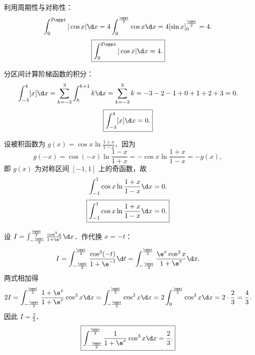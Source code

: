 \begin{solution}

    利用周期性与对称性：
    \begin{equation}
        \int_0^{2\uppi} |\cos x| \d x = 4 \int_0^{\frac{\uppi}{2}} \cos x \d x = 4 [\sin x]_0^{\frac{\uppi}{2}} = 4.
    \end{equation}
    \begin{equation}
        \boxed{\int_0^{2\uppi} |\cos x| \d x = 4.}
    \end{equation}


    分区间计算阶梯函数的积分：
    \begin{equation}
        \int_{-3}^4 [x] \d x = \sum_{k=-3}^3 \int_k^{k+1} k \d x = \sum_{k=-3}^3 k = -3 - 2 - 1 + 0 + 1 + 2 + 3 = 0.
    \end{equation}
    \begin{equation}
        \boxed{\int_{-3}^4 [x] \d x = 0.}
    \end{equation}


    设被积函数为 $g(x) = \cos x \ln\frac{1 + x}{1 - x}$．因为
    \begin{equation}
        g(-x) = \cos(-x) \ln\frac{1 - x}{1 + x} = -\cos x \ln\frac{1 + x}{1 - x} = -g(x),
    \end{equation}
    即 $g(x)$ 为对称区间 $[-1, 1]$ 上的奇函数，故
    \begin{equation}
        \int_{-1}^1 \cos x \ln\frac{1 + x}{1 - x} \d x = 0.
    \end{equation}
    \begin{equation}
        \boxed{\int_{-1}^1 \cos x \ln\frac{1 + x}{1 - x} \d x = 0.}
    \end{equation}


    设 $I = \int_{-\frac{\uppi}{2}}^{\frac{\uppi}{2}} \frac{\cos^3 x}{1 + \e^x} \d x$．作代换 $x = -t$：
    \begin{equation}
        I = \int_{-\frac{\uppi}{2}}^{\frac{\uppi}{2}} \frac{\cos^3(-t)}{1 + \e^{-t}} \d t = \int_{-\frac{\uppi}{2}}^{\frac{\uppi}{2}} \frac{\e^x \cos^3 x}{1 + \e^x} \d x.
    \end{equation}
    两式相加得
    \begin{equation}
        2I = \int_{-\frac{\uppi}{2}}^{\frac{\uppi}{2}} \frac{1 + \e^x}{1 + \e^x}\cos^3 x \d x = \int_{-\frac{\uppi}{2}}^{\frac{\uppi}{2}} \cos^3 x \d x = 2\int_0^{\frac{\uppi}{2}} \cos^3 x \d x = 2 \cdot \frac{2}{3} = \frac{4}{3}.
    \end{equation}
    因此 $I = \frac{2}{3}$．
    \begin{equation}
        \boxed{\int_{-\frac{\uppi}{2}}^{\frac{\uppi}{2}} \frac{1}{1 + \e^x} \cos^3 x \d x = \frac{2}{3}.}
    \end{equation}


\end{solution}
